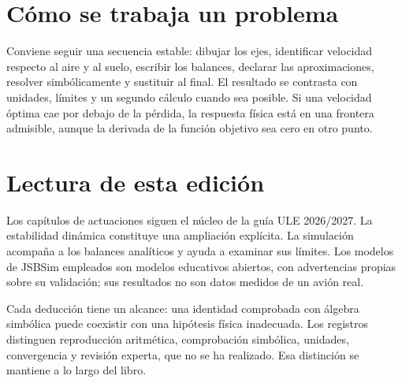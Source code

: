 \section{Cómo se trabaja un problema}
Conviene seguir una secuencia estable: dibujar los ejes, identificar velocidad respecto al aire y al suelo, escribir los balances, declarar las aproximaciones, resolver simbólicamente y sustituir al final. El resultado se contrasta con unidades, límites y un segundo cálculo cuando sea posible. Si una velocidad óptima cae por debajo de la pérdida, la respuesta física está en una frontera admisible, aunque la derivada de la función objetivo sea cero en otro punto.


\section{Lectura de esta edición}
Los capítulos de actuaciones siguen el núcleo de la guía ULE 2026/2027. La estabilidad dinámica constituye una ampliación explícita. La simulación acompaña a los balances analíticos y ayuda a examinar sus límites. Los modelos de JSBSim empleados son modelos educativos abiertos, con advertencias propias sobre su validación; sus resultados no son datos medidos de un avión real.

Cada deducción tiene un alcance: una identidad comprobada con álgebra simbólica puede coexistir con una hipótesis física inadecuada. Los registros distinguen reproducción aritmética, comprobación simbólica, unidades, convergencia y revisión experta, que no se ha realizado. Esa distinción se mantiene a lo largo del libro.


